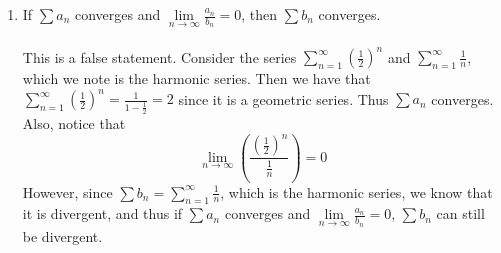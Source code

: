 \documentclass[12pt,letterpaper]{article}
\newcommand{\limx}[2]{\displaystyle\lim\limits_{#1 \to #2}}
\theoremstyle{case}
\theoremstyle{definition}
\begin{document}
\begin{enumerate}
\begin{enumerate}
			\item If $\sum a_n$ converges and $\limx{n}{\infty} \frac{a_n}{b_n}=0$, then $\sum b_n$ converges.
			\\\\This is a false statement. Consider the series $\displaystyle\sum_{n=1}^{\infty} \left(\frac{1}{2}\right)^n$ and $\displaystyle\sum_{n=1}^{\infty} \frac{1}{n}$, which we note is the harmonic series. Then we have that $\displaystyle\sum_{n=1}^{\infty} \left(\frac{1}{2}\right)^n = \frac{1}{1-\frac{1}{2}} = 2$ since it is a geometric series. Thus $\sum a_n$ converges. Also, notice that
			\[\limx{n}{\infty} \left(\frac{\left(\frac{1}{2}\right)^n}{\frac{1}{n}}\right)=0\]
			However, since $\sum b_n = \displaystyle\sum_{n=1}^{\infty} \frac{1}{n}$, which is the harmonic series, we know that it is divergent, and thus if $\sum a_n$ converges and $\limx{n}{\infty} \frac{a_n}{b_n}=0$, $\sum b_n$ can still be divergent.
		\end{enumerate}
	\end{enumerate}
\end{document}
